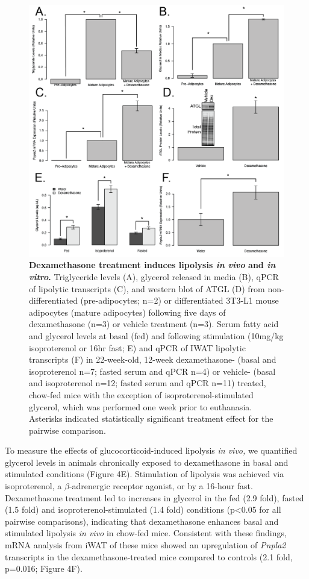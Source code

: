 \documentclass[11pt]{article} %
\begin{document}
\begin{figure}
  \begin{center}
    \includegraphics[width=\textwidth]{Figures_Figure_4.png}
  \end{center}
  \caption{
\textbf{Dexamethasone treatment induces lipolysis \emph{in
vivo} and \emph{in vitro}.}  Triglyceride levels (A), glycerol released in media (B), qPCR of
lipolytic transcripts (C), and western blot of ATGL (D) from
non-differentiated (pre-adipocytes; n=2) or differentiated 3T3-L1 mouse
adipocytes (mature adipocytes) following five days of dexamethasone
(n=3) or vehicle treatment (n=3). Serum fatty acid and glycerol levels
at basal (fed) and following stimulation (10mg/kg isoproterenol or 16hr
fast; E) and qPCR of IWAT lipolytic transcripts (F) in 22-week-old,
12-week dexamethasone- (basal and isoproterenol n=7; fasted serum and
qPCR n=4) or vehicle- (basal and isoproterenol n=12; fasted serum and
qPCR n=11) treated, chow-fed mice with the exception of
isoproterenol-stimulated glycerol, which was performed one week prior to
euthanasia. Asterisks indicated statistically significant treatment
effect for the pairwise comparison.}
 \label{fig:4}
\end{figure}

To measure the effects of glucocorticoid-induced lipolysis \emph{in
vivo,} we quantified glycerol levels in animals chronically exposed to
dexamethasone in basal and stimulated conditions (Figure 4E).
Stimulation of lipolysis was achieved via isoproterenol, a $\beta$-adrenergic
receptor agonist, or by a 16-hour fast. Dexamethasone treatment led to
increases in glycerol in the fed (2.9 fold), fasted (1.5 fold) and
isoproterenol-stimulated (1.4 fold) conditions (p\textless{}0.05 for all
pairwise comparisons), indicating that dexamethasone enhances basal and
stimulated lipolysis \emph{in vivo} in chow-fed mice. Consistent with
these findings, mRNA analysis from iWAT of these mice showed an
upregulation of \emph{Pnpla2} transcripts in the dexamethasone-treated
mice compared to controls (2.1 fold, p=0.016; Figure 4F).
\end{document}
